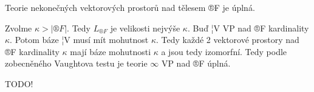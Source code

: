 \documentclass[12pt]{article}                   %
\begin{document}
        \begin{tvrzeni}
            Teorie nekonečných vektorových prostorů nad tělesem ®F je úplná.

            \begin{dukazin}
                Zvolme $\kappa > |®F|$. Tedy $L_{®F}$ je velikosti nejvýše $\kappa$. Buď ¦V VP nad ®F kardinality $\kappa$. Potom báze ¦V musí mít mohutnost $\kappa$. Tedy každé 2 vektorové prostory nad ®F kardinality $\kappa$ mají báze mohutnosti $\kappa$ a jsou tedy izomorfní. Tedy podle zobecněného Vaughtova testu je teorie $∞$ VP nad ®F úplná.
            \end{dukazin}
        \end{tvrzeni}

        \begin{veta}
            TODO!
        \end{veta}
\end{document}
